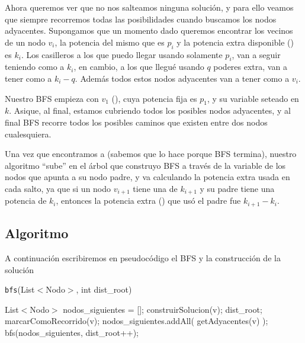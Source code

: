 Ahora queremos ver que no nos salteamos ninguna soluci\'on, y para ello veamos que siempre recorremos todas las posibilidades cuando buscamos los nodos adyacentes. Supongamos que un momento dado queremos encontrar los vecinos de un nodo $v_i$, la potencia del mismo que es $p_i$ y la potencia extra disponible () es $k_i$. Los casilleros a los que puedo llegar usando solamente $p_i$, van a seguir teniendo como  a $k_i$, en cambio, a los que llegu\'e usando $q$ poderes extra, van a tener como  a $k_i-q$. Adem\'as todos estos nodos adyacentes van a tener como  a $v_i$. 

Nuestro BFS empieza con $v_1$ (), cuya potencia fija es $p_1$, y su variable  seteado en $k$. Asique, al final, estamos cubriendo todos los posibles nodos adyacentes, y al final BFS recorre todos los posibles caminos que existen entre dos nodos cualesquiera. 

Una vez que encontramos a  (sabemos que lo hace porque BFS termina), nuestro algoritmo ``sube'' en el \'arbol que construyo BFS a trav\'es de la variable de los nodos  que apunta a su nodo padre, y va calculando la potencia extra usada en cada salto, ya que si un nodo $v_{i+1}$ tiene una  de $k_{i+1}$ y su padre tiene una potencia de $k_i$, entonces la potencia extra () que us\'o el padre fue $k_{i+1} - k_i$.

\subsection{Algoritmo}

A continuaci\'on escribiremos en pseudoc\'odigo el BFS y la construcci\'on de la soluci\'on

\begin{algorithm}[H]
\caption{int resolver(){}
\begin{algorithmic}[1]
  \STATE return bfs([src], 1);
\end{algorithmic}
\end{algorithm}

\begin{algorithm}[H]
\caption{\texttt{bfs}(List$<$Nodo$>$, int dist\_root)}
\begin{algorithmic}[1]
  \STATE List$<$Nodo$>$ nodos\_siguientes = [];
        \STATE construirSolucion(v);
        \RETURN dist\_root;
      \ELSE
        \STATE marcarComoRecorrido(v);
        \STATE nodos\_siguientes.addAll( getAdyacentes(v) );
      \ENDIF
    \ENDIF
  \ENDFOR
  \RETURN bfs(nodos\_siguientes, dist\_root++);
\end{algorithmic}
\end{algorithm}

